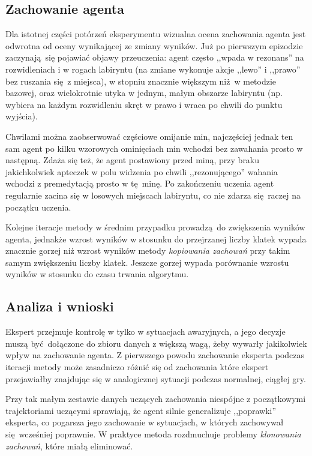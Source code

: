 \subsection {Zachowanie agenta}
Dla istotnej części potórzeń eksperymentu wizualna ocena zachowania agenta jest odwrotna od oceny wynikającej ze zmiany wyników. Już po pierwszym epizodzie zaczynają się pojawiać objawy przeuczenia: agent często ,,wpada w rezonans'' na rozwidleniach i w rogach labiryntu (na zmiane wykonuje akcje ,,lewo'' i ,,prawo'' bez ruszania się z miejsca), w stopniu znacznie większym niż w metodzie bazowej, oraz wielokrotnie utyka w jednym, małym obszarze labiryntu (np. wybiera na każdym rozwidleniu skręt w prawo i wraca po chwili do punktu wyjścia).

Chwilami można zaobserwować częściowe omijanie min, najczęściej jednak ten sam agent po kilku wzorowych ominięciach min wchodzi bez zawahania prosto w następną. Zdaża się też, że agent postawiony przed miną, przy braku jakichkolwiek apteczek w polu widzenia po chwili ,,rezonującego'' wahania wchodzi z premedytacją prosto w tę minę. Po zakończeniu uczenia agent regularnie zacina się w losowych miejscach labiryntu, co nie zdarza się raczej na początku uczenia.

Kolejne iteracje metody w średnim przypadku prowadzą do zwiększenia wyników agenta, jednakże wzrost wyników w stosunku do przejrzanej liczby klatek wypada znacznie gorzej niż wzrost wyników metody \textit{kopiowania zachowań} przy takim samym zwiększeniu liczby klatek. Jeszcze gorzej wypada porównanie wzrostu wyników w stosunku do czasu trwania algorytmu. 

\subsection {Analiza i wnioski}

Ekspert przejmuje kontrolę w tylko w sytuacjach awaryjnych, a jego decyzje muszą być dołączone do zbioru danych z większą wagą, żeby wywarły jakikolwiek wpływ na zachowanie agenta. Z pierwszego powodu zachowanie eksperta podczas iteracji metody może zasadniczo różnić się od zachowania które ekspert przejawiałby znajdując się w analogicznej sytuacji podczas normalnej, ciągłej gry.

Przy tak małym zestawie danych uczących zachowania niespójne z początkowymi trajektoriami uczącymi sprawiają, że agent silnie generalizuje ,,poprawki'' eksperta, co pogarsza jego zachowanie w sytuacjach, w których zachowywał się wcześniej poprawnie. W praktyce metoda rozdmuchuje problemy \textit{ klonowania zachowań}, które miałą eliminować.

